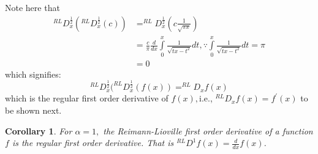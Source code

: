 \documentclass{amsart}%
\theoremstyle{plain}
\newtheorem{corollary}{Corollary}
\numberwithin{equation}{section}
\begin{document}
Note here that
\begin{align*}
^{RL}D_{x}^{\frac{1}{2}}(^{RL}D_{x}^{\frac{1}{2}}(c))  & =^{RL}D_{x}^{\frac
{1}{2}}(c\frac{1}{\sqrt{\pi x}})\\
& =\frac{c}{\pi}\frac{d}{dx}%
{\displaystyle\int\limits_{0}^{x}}
\frac{1}{\sqrt{tx-t^{2}}}dt,\because%
{\displaystyle\int\limits_{0}^{x}}
\frac{1}{\sqrt{tx-t^{2}}}dt=\pi\\
& =0
\end{align*}
which signifies:
\[
^{RL}D_{x}^{\frac{1}{2}}(^{RL}D_{x}^{\frac{1}{2}}\left(  f(x)\right)
=^{RL}D_{x}f(x)
\]
which is the regular first order derivative of $f(x),$i.e., $^{RL}%
D_{x}f(x)=f^{\prime}(x)$ to be shown next.

\begin{corollary}
For $\alpha=1,$ the Reimann-Lioville first order derivative of a function $f $
is the regular first order derivative. That is $^{RL}D^{1}f(x)=\frac{d}%
{dx}f(x)$.
\end{corollary}
\end{document}
